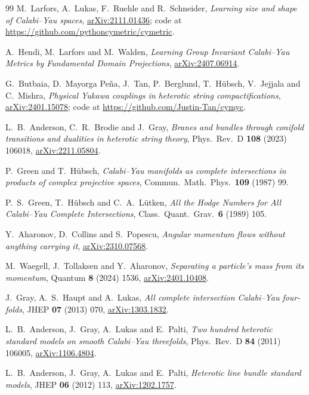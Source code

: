 \documentclass[11pt,a4paper]{article}
\theoremstyle{definition}
\begin{document}
\begin{thebibliography}{99}
M.~Larfors, A.~Lukas, F.~Ruehle and R.~Schneider,
\emph{Learning size and shape of Calabi--Yau spaces},
\href{https://arxiv.org/abs/2111.01436}{arXiv:2111.01436};
code at \url{https://github.com/pythoncymetric/cymetric}.

A.~Hendi, M.~Larfors and M.~Walden,
\emph{Learning Group Invariant Calabi--Yau Metrics by Fundamental Domain
Projections},
\href{https://arxiv.org/abs/2407.06914}{arXiv:2407.06914}.

G.~Butbaia, D.~Mayorga Pe\~na, J.~Tan, P.~Berglund, T.~H\"ubsch,
V.~Jejjala and C.~Mishra,
\emph{Physical Yukawa couplings in heterotic string compactifications},
\href{https://arxiv.org/abs/2401.15078}{arXiv:2401.15078};
code at \url{https://github.com/Justin-Tan/cymyc}.

L.~B.~Anderson, C.~R.~Brodie and J.~Gray,
\emph{Branes and bundles through conifold transitions and dualities in heterotic string theory},
Phys.\ Rev.\ D \textbf{108} (2023) 106018,
\href{https://arxiv.org/abs/2211.05804}{arXiv:2211.05804}.




P.~Green and T.~H\"ubsch,
\emph{Calabi--Yau manifolds as complete intersections in products of complex projective spaces},
Commun.\ Math.\ Phys.\ \textbf{109} (1987) 99.

P.~S.~Green, T.~H\"ubsch and C.~A.~L\"utken,
\emph{All the Hodge Numbers for All Calabi--Yau Complete Intersections},
Class.\ Quant.\ Grav.\ \textbf{6} (1989) 105.


Y.~Aharonov, D.~Collins and S.~Popescu,
\emph{Angular momentum flows without anything carrying it},
\href{https://arxiv.org/abs/2310.07568}{arXiv:2310.07568}.

M.~Waegell, J.~Tollaksen and Y.~Aharonov,
\emph{Separating a particle's mass from its momentum},
Quantum \textbf{8} (2024) 1536,
\href{https://arxiv.org/abs/2401.10408}{arXiv:2401.10408}.



J.~Gray, A.~S.~Haupt and A.~Lukas,
\emph{All complete intersection Calabi--Yau four-folds},
JHEP \textbf{07} (2013) 070,
\href{https://arxiv.org/abs/1303.1832}{arXiv:1303.1832}.


L.~B.~Anderson, J.~Gray, A.~Lukas and E.~Palti,
\emph{Two hundred heterotic standard models on smooth Calabi--Yau threefolds},
Phys.\ Rev.\ D \textbf{84} (2011) 106005,
\href{https://arxiv.org/abs/1106.4804}{arXiv:1106.4804}.

L.~B.~Anderson, J.~Gray, A.~Lukas and E.~Palti,
\emph{Heterotic line bundle standard models},
JHEP \textbf{06} (2012) 113,
\href{https://arxiv.org/abs/1202.1757}{arXiv:1202.1757}.





\end{thebibliography}
\end{document}
